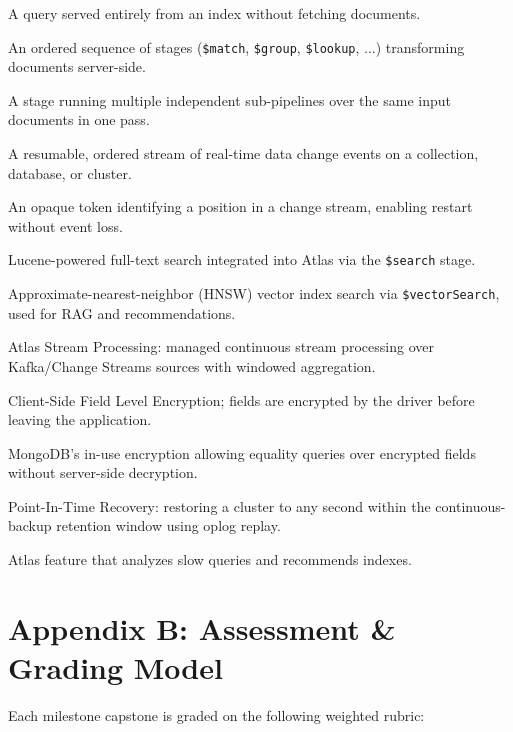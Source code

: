\documentclass[11pt, a4paper]{article}
\begin{document}
\begin{description}[leftmargin=4.5em, style=nextline, itemsep=0pt]
    \item[Covered Query] A query served entirely from an index without fetching documents.
    \item[Aggregation Pipeline] An ordered sequence of stages (\texttt{\$match}, \texttt{\$group}, \texttt{\$lookup}, ...) transforming documents server-side.
    \item[\$facet] A stage running multiple independent sub-pipelines over the same input documents in one pass.
    \item[Change Stream] A resumable, ordered stream of real-time data change events on a collection, database, or cluster.
    \item[Resume Token] An opaque token identifying a position in a change stream, enabling restart without event loss.
    \item[Atlas Search] Lucene-powered full-text search integrated into Atlas via the \texttt{\$search} stage.
    \item[Atlas Vector Search] Approximate-nearest-neighbor (HNSW) vector index search via \texttt{\$vectorSearch}, used for RAG and recommendations.
    \item[ASP] Atlas Stream Processing: managed continuous stream processing over Kafka/Change Streams sources with windowed aggregation.
    \item[CSFLE] Client-Side Field Level Encryption; fields are encrypted by the driver before leaving the application.
    \item[Queryable Encryption (QE)] MongoDB's in-use encryption allowing equality queries over encrypted fields without server-side decryption.
    \item[PITR] Point-In-Time Recovery: restoring a cluster to any second within the continuous-backup retention window using oplog replay.
    \item[Performance Advisor] Atlas feature that analyzes slow queries and recommends indexes.
\end{description}

\section{Appendix B: Assessment \& Grading Model}
Each milestone capstone is graded on the following weighted rubric:
\end{document}
